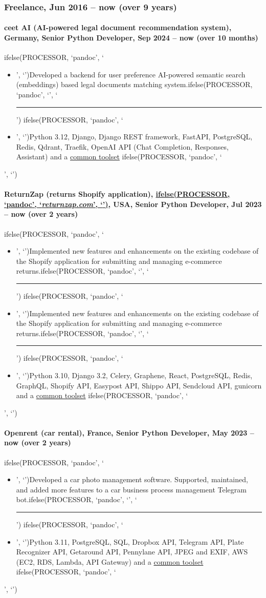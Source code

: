 \documentclass[a4paper,8pt]{extarticle}
\newcommand{\chref}[2]{\href{#1}
{ifelse(PROCESSOR, `pandoc', `#2', `\underline{\smash{#2}}')}}
\newcommand{\itchref}[2]{\chref{#1}{\textit{#2}}}  %
\newcommand{\chrule}{ifelse(PROCESSOR, `pandoc', `', `\vspace{3pt}\hrule')}
\newcommand{\pdbeginitemize}{ifelse(PROCESSOR, `pandoc', `\begin{itemize}', `')}
\newcommand{\pditem}{ifelse(PROCESSOR, `pandoc', `\item', `')}
\newcommand{\pdenditemize}{ifelse(PROCESSOR, `pandoc', `\end{itemize}', `')}
\begin{document}
\subsubsection*{Freelance, Jun 2016 -- now (over 9 years)}
\paragraph*{ceet AI (AI-powered legal document recommendation system), Germany, Senior Python Developer, Sep 2024 -- now (over 10 months)}
\pdbeginitemize
\pditem Developed a backend for user preference AI-powered semantic search (embeddings) based legal documents matching system.\chrule
\pditem Python 3.12, Django, Django REST framework, FastAPI, PostgreSQL, Redis, Qdrant, Traefik, OpenAI API (Chat Completion, Responses, Assistant) and a \hyperlink{common-toolset}{common toolset}
\pdenditemize

\paragraph*{ReturnZap (returns Shopify application), \itchref{https://returnzap.com}{returnzap.com}, USA, Senior Python Developer, Jul 2023 -- now (over 2 years)}
\pdbeginitemize
\pditem Implemented new features and enhancements on the existing codebase of the Shopify application for submitting and managing e-commerce returns.\chrule
\pditem Implemented new features and enhancements on the existing codebase of the Shopify application for submitting and managing e-commerce returns.\chrule
\pditem Python 3.10, Django 3.2, Celery, Graphene, React, PostgreSQL, Redis, GraphQL, Shopify API, Easypost API, Shippo API, Sendcloud API, gunicorn and a \hyperlink{common-toolset}{common toolset}
\pdenditemize

\paragraph*{Openrent (car rental), France, Senior Python Developer, May 2023 -- now (over 2 years)}
\pdbeginitemize
\pditem Developed a car photo management software. Supported, maintained, and added more features to a car business process management Telegram bot.\chrule
\pditem Python 3.11, PostgreSQL, SQL, Dropbox API, Telegram API, Plate Recognizer API, Getaround API, Pennylane API, JPEG and EXIF, AWS (EC2, RDS, Lambda, API Gateway) and a \hyperlink{common-toolset}{common toolset}
\pdenditemize
\end{document}
